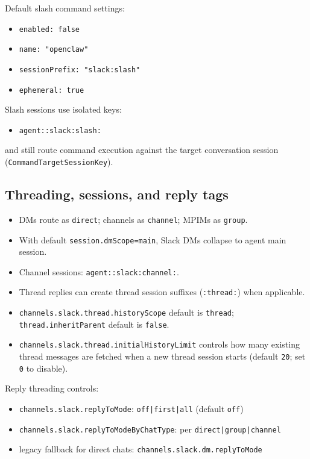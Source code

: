 Default slash command settings:

\begin{itemize}
  \item \texttt{enabled: false}
  \item \texttt{name: "openclaw"}
  \item \texttt{sessionPrefix: "slack:slash"}
  \item \texttt{ephemeral: true}
\end{itemize}


Slash sessions use isolated keys:

\begin{itemize}
  \item \texttt{agent::slack:slash:}
\end{itemize}


and still route command execution against the target conversation session (\texttt{CommandTargetSessionKey}).

\subsection{Threading, sessions, and reply tags}


\begin{itemize}
  \item DMs route as \texttt{direct}; channels as \texttt{channel}; MPIMs as \texttt{group}.
  \item With default \texttt{session.dmScope=main}, Slack DMs collapse to agent main session.
  \item Channel sessions: \texttt{agent::slack:channel:}.
  \item Thread replies can create thread session suffixes (\texttt{:thread:}) when applicable.
  \item \texttt{channels.slack.thread.historyScope} default is \texttt{thread}; \texttt{thread.inheritParent} default is \texttt{false}.
  \item \texttt{channels.slack.thread.initialHistoryLimit} controls how many existing thread messages are fetched when a new thread session starts (default \texttt{20}; set \texttt{0} to disable).
\end{itemize}


Reply threading controls:

\begin{itemize}
  \item \texttt{channels.slack.replyToMode}: \texttt{off|first|all} (default \texttt{off})
  \item \texttt{channels.slack.replyToModeByChatType}: per \texttt{direct|group|channel}
  \item legacy fallback for direct chats: \texttt{channels.slack.dm.replyToMode}
\end{itemize}


